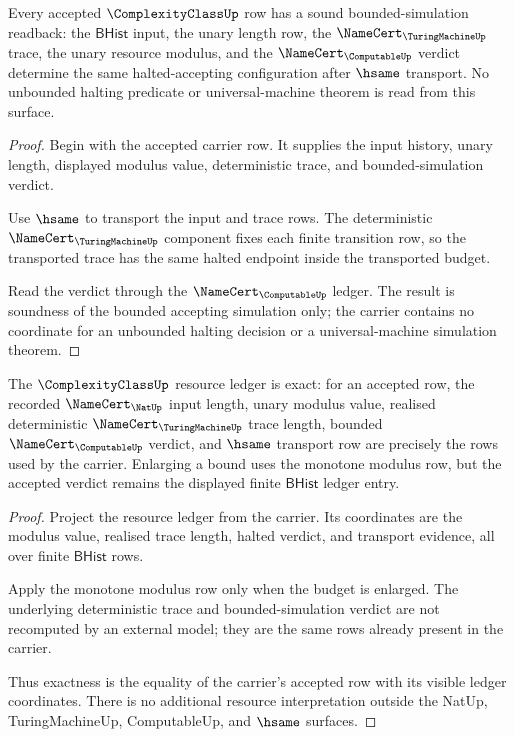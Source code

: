 \begin{theorem}
\label{thm:complexityclass-bounded-simulation-soundness}
Every accepted $\ComplexityClassUp$ row has a sound bounded-simulation
readback: the $\mathsf{BHist}$ input, the unary length row, the
$\NameCert_{\TuringMachineUp}$ trace, the unary resource modulus, and the
$\NameCert_{\ComputableUp}$ verdict determine the same halted-accepting
configuration after $\hsame$ transport. No unbounded halting predicate or
universal-machine theorem is read from this surface.
\end{theorem}
\begin{proof}
Begin with the accepted carrier row. It supplies the input history, unary
length, displayed modulus value, deterministic trace, and bounded-simulation
verdict.

Use $\hsame$ to transport the input and trace rows. The deterministic
$\NameCert_{\TuringMachineUp}$ component fixes each finite transition row, so
the transported trace has the same halted endpoint inside the transported
budget.

Read the verdict through the $\NameCert_{\ComputableUp}$ ledger. The result is
soundness of the bounded accepting simulation only; the carrier contains no
coordinate for an unbounded halting decision or a universal-machine
simulation theorem.
\end{proof}

\begin{theorem}
\label{thm:complexityclass-resource-ledger-exactness}
The $\ComplexityClassUp$ resource ledger is exact: for an accepted row, the
recorded $\NameCert_{\NatUp}$ input length, unary modulus value, realised
deterministic $\NameCert_{\TuringMachineUp}$ trace length, bounded
$\NameCert_{\ComputableUp}$ verdict, and $\hsame$ transport row are precisely
the rows used by the carrier. Enlarging a bound
uses the monotone modulus row, but the accepted verdict remains the displayed
finite $\mathsf{BHist}$ ledger entry.
\end{theorem}
\begin{proof}
Project the resource ledger from the carrier. Its coordinates are the modulus
value, realised trace length, halted verdict, and transport evidence, all over
finite $\mathsf{BHist}$ rows.

Apply the monotone modulus row only when the budget is enlarged. The
underlying deterministic trace and bounded-simulation verdict are not
recomputed by an external model; they are the same rows already present in the
carrier.

Thus exactness is the equality of the carrier's accepted row with its visible
ledger coordinates. There is no additional resource interpretation outside
the NatUp, TuringMachineUp, ComputableUp, and $\hsame$ surfaces.
\end{proof}

